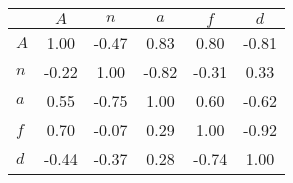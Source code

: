 \begin{tabular}{lccccc}
\toprule
 & $A$ & $n$ & $a$ & $f$ & $d$ \\
\midrule
$A$ & {\cellcolor[HTML]{2C1A4C}} \color[HTML]{F1F1F1} 1.00 & {\cellcolor[HTML]{A3A369}} \color[HTML]{F1F1F1} -0.47 & {\cellcolor[HTML]{293B6D}} \color[HTML]{F1F1F1} 0.83 & {\cellcolor[HTML]{283F72}} \color[HTML]{F1F1F1} 0.80 & {\cellcolor[HTML]{4E4E21}} \color[HTML]{F1F1F1} -0.81 \\
$n$ & {\cellcolor[HTML]{D9D9B3}} \color[HTML]{000000} -0.22 & {\cellcolor[HTML]{2C1A4C}} \color[HTML]{F1F1F1} 1.00 & {\cellcolor[HTML]{4C4C20}} \color[HTML]{F1F1F1} -0.82 & {\cellcolor[HTML]{C9C996}} \color[HTML]{000000} -0.31 & {\cellcolor[HTML]{8BA7C2}} \color[HTML]{F1F1F1} 0.33 \\
$a$ & {\cellcolor[HTML]{4D78A1}} \color[HTML]{F1F1F1} 0.55 & {\cellcolor[HTML]{5B5B2C}} \color[HTML]{F1F1F1} -0.75 & {\cellcolor[HTML]{2C1A4C}} \color[HTML]{F1F1F1} 1.00 & {\cellcolor[HTML]{3F6B99}} \color[HTML]{F1F1F1} 0.60 & {\cellcolor[HTML]{7B7B47}} \color[HTML]{F1F1F1} -0.62 \\
$f$ & {\cellcolor[HTML]{2B5385}} \color[HTML]{F1F1F1} 0.70 & {\cellcolor[HTML]{EDEEDF}} \color[HTML]{000000} -0.07 & {\cellcolor[HTML]{97B0C8}} \color[HTML]{000000} 0.29 & {\cellcolor[HTML]{2C1A4C}} \color[HTML]{F1F1F1} 1.00 & {\cellcolor[HTML]{36360F}} \color[HTML]{F1F1F1} -0.92 \\
$d$ & {\cellcolor[HTML]{AAAA6F}} \color[HTML]{F1F1F1} -0.44 & {\cellcolor[HTML]{BCBC83}} \color[HTML]{000000} -0.37 & {\cellcolor[HTML]{9BB3CB}} \color[HTML]{000000} 0.28 & {\cellcolor[HTML]{5F5F2F}} \color[HTML]{F1F1F1} -0.74 & {\cellcolor[HTML]{2C1A4C}} \color[HTML]{F1F1F1} 1.00 \\
\bottomrule
\end{tabular}
